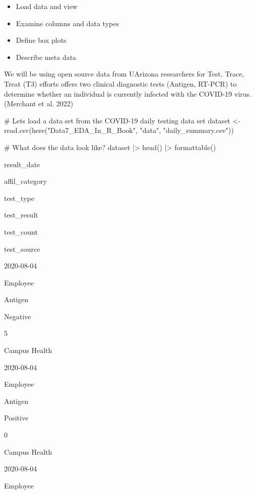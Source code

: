\documentclass[
  letterpaper,
  DIV=11,
  numbers=noendperiod]{scrreprt}
\newenvironment{Shaded}{\begin{snugshade}}{\end{snugshade}}
\newcommand{\CommentTok}[1]{\textcolor[rgb]{0.37,0.37,0.37}{#1}}
\newcommand{\FunctionTok}[1]{\textcolor[rgb]{0.28,0.35,0.67}{#1}}
\newcommand{\NormalTok}[1]{\textcolor[rgb]{0.00,0.23,0.31}{#1}}
\newcommand{\OtherTok}[1]{\textcolor[rgb]{0.00,0.23,0.31}{#1}}
\newcommand{\SpecialCharTok}[1]{\textcolor[rgb]{0.37,0.37,0.37}{#1}}
\newcommand{\StringTok}[1]{\textcolor[rgb]{0.13,0.47,0.30}{#1}}
\providecommand{\tightlist}{%
  \setlength{\itemsep}{0pt}\setlength{\parskip}{0pt}}\usepackage{longtable,booktabs,array}
\begin{document}
\begin{itemize}
\tightlist
\item
  Load data and view
\item
  Examine columns and data types
\item
  Define box plots
\item
  Describe meta data
\end{itemize}

We will be using open source data from UArizona researchers for Test,
Trace, Treat (T3) efforts offers two clinical diagnostic tests (Antigen,
RT-PCR) to determine whether an individual is currently infected with
the COVID-19 virus. (Merchant et al. 2022)

\begin{Shaded}
\begin{Highlighting}[]
\CommentTok{\# Let\textquotesingle{}s load a data set from the COVID{-}19 daily testing data set}
\NormalTok{dataset }\OtherTok{\textless{}{-}} \FunctionTok{read.csv}\NormalTok{(}\FunctionTok{here}\NormalTok{(}\StringTok{"Data7\_EDA\_In\_R\_Book"}\NormalTok{, }\StringTok{"data"}\NormalTok{, }\StringTok{"daily\_summary.csv"}\NormalTok{)) }

\CommentTok{\# What does the data look like?}
\NormalTok{dataset }\SpecialCharTok{|\textgreater{}}
  \FunctionTok{head}\NormalTok{() }\SpecialCharTok{|\textgreater{}}
  \FunctionTok{formattable}\NormalTok{()}
\end{Highlighting}
\end{Shaded}

result\_date

affil\_category

test\_type

test\_result

test\_count

test\_source

2020-08-04

Employee

Antigen

Negative

5

Campus Health

2020-08-04

Employee

Antigen

Positive

0

Campus Health

2020-08-04

Employee
\end{document}
